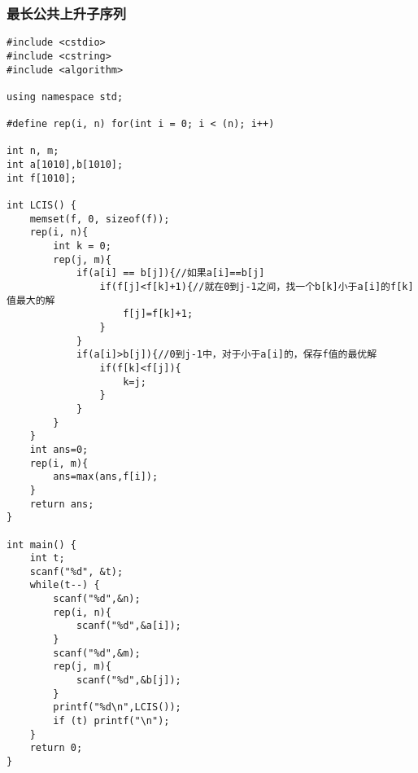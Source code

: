 \subsubsection{最长公共上升子序列}
\begin{verbatim}
#include <cstdio>
#include <cstring>
#include <algorithm>

using namespace std;

#define rep(i, n) for(int i = 0; i < (n); i++)

int n, m;
int a[1010],b[1010];
int f[1010];

int LCIS() {
	memset(f, 0, sizeof(f));
	rep(i, n){
		int k = 0;
		rep(j, m){
			if(a[i] == b[j]){//如果a[i]==b[j] 
				if(f[j]<f[k]+1){//就在0到j-1之间，找一个b[k]小于a[i]的f[k]值最大的解
					f[j]=f[k]+1;
				}
			}
			if(a[i]>b[j]){//0到j-1中，对于小于a[i]的，保存f值的最优解
				if(f[k]<f[j]){
					k=j;
				}
			}
		}
	}
	int ans=0;
	rep(i, m){
		ans=max(ans,f[i]);
	}
	return ans;
}

int main() {
	int t;
	scanf("%d", &t);
	while(t--) {
		scanf("%d",&n);
		rep(i, n){
			scanf("%d",&a[i]);
		}
		scanf("%d",&m);
		rep(j, m){
			scanf("%d",&b[j]);
		}
		printf("%d\n",LCIS());
		if (t) printf("\n");
	}
	return 0;
}
\end{verbatim}
